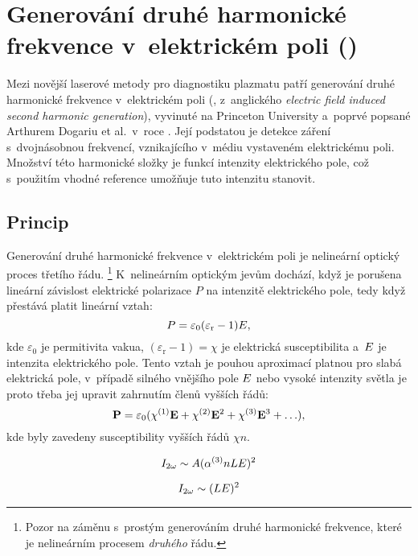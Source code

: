 \chapter[\EFISH]{Generování druhé harmonické frekvence
	v~elektrickém poli (\EFISH)}
\label{sec:efishth}

\newcommand\epol{P}
\newcommand\epolsh{P}
\newcommand\esus{\chi}
\newcommand\esusn[1]{\esus^{(#1)}}
\newcommand\eper{\varepsilon}
\newcommand\epervac{\eper_0}
\newcommand\eperrel{\eper_\text{r}}

Mezi novější laserové metody pro diagnostiku plazmatu patří
generování druhé harmonické frekvence v~elektrickém poli (\EFISH{},
z~anglického \emph{electric field induced second harmonic generation}),
vyvinuté na Princeton University a~poprvé popsané
Arthurem Dogariu et al.~v~roce \citeyear{efish-original}.
\autocite{efish-original,efish-2018}
Její podstatou je detekce záření s~dvojnásobnou frekvencí, vznikajícího
v~médiu vystaveném elektrickému poli.
Množství této harmonické složky je funkcí intenzity elektrického pole,
což s~použitím vhodné reference umožňuje tuto intenzitu stanovit.

\section{Princip}
\label{sec:efishth-principle}
Generování druhé harmonické frekvence v~elektrickém poli
je nelineární optický proces třetího řádu.%
\footnote{Pozor na záměnu s~prostým generováním druhé harmonické frekvence,
které je nelineárním procesem \emph{druhého} řádu.}
K~nelineárním optickým jevům dochází, když je porušena lineární závislost
elektrické polarizace $\epol$ na intenzitě elektrického pole,
tedy když přestává platit lineární vztah:
\begin{equation}
	\label{eq:efishth-epol-linear}
	\epol = \epervac (\eperrel - 1) \elfield,
\end{equation}
kde $\epervac$ je permitivita vakua,
$(\eperrel - 1) = \esus$ je elektrická susceptibilita
a~$E$ je intenzita elektrického pole.
Tento vztah je pouhou aproximací platnou pro slabá elektrická pole,
v~případě silného vnějšího pole $E$ nebo vysoké intenzity světla
je proto třeba jej upravit zahrnutím členů vyšších řádů:
\begin{equation}
	\label{eq:efishth-epol-general}
	\vec\epol = \epervac (\esusn1\vec\elfield + \esusn2\vec\elfield^2
		+ \esusn3\vec\elfield^3 + \ldots),
\end{equation}
kde byly zavedeny susceptibility vyšších řádů $\esus{n}$.

\begin{equation}
	\label{eq:efishth-prop}
	I_{2\omega} \sim A (\alpha^{(3)} n L E)^2
\end{equation}

\begin{equation}
	\label{eq:efishth-prop-simple}
	I_{2\omega} \sim (L E)^2
\end{equation}
